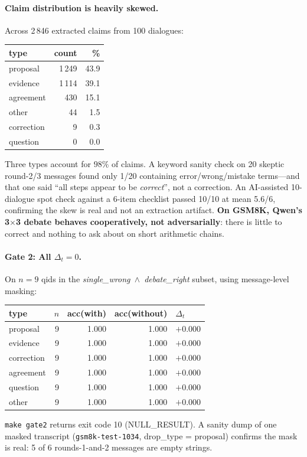 \begin{itemize}
\paragraph{Claim distribution is heavily skewed.}
Across 2\,846 extracted claims from 100 dialogues:
\begin{center}
\begin{tabular}{lrr}
\toprule
type & count & \% \\
\midrule
proposal   & 1\,249 & 43.9 \\
evidence   & 1\,114 & 39.1 \\
agreement  &    430 & 15.1 \\
other      &     44 &  1.5 \\
correction &      9 &  0.3 \\
question   &      0 &  0.0 \\
\bottomrule
\end{tabular}
\end{center}
Three types account for $98\%$ of claims. A keyword sanity check on 20 skeptic round-2/3 messages found only 1/20 containing error/wrong/mistake terms---and that one said ``all steps appear to be \textit{correct}'', not a correction. An AI-assisted 10-dialogue spot check against a 6-item checklist passed 10/10 at mean 5.6/6, confirming the skew is real and not an extraction artifact. \textbf{On GSM8K, Qwen's 3$\times$3 debate behaves cooperatively, not adversarially}: there is little to correct and nothing to ask about on short arithmetic chains.

\paragraph{Gate 2: All $\Delta_t=0$.}
On $n=9$ qids in the \textit{single\_wrong~$\wedge$~debate\_right} subset, using message-level masking:
\begin{center}
\begin{tabular}{lrrrl}
\toprule
type & $n$ & acc(with) & acc(without) & $\Delta_t$ \\
\midrule
proposal   & 9 & 1.000 & 1.000 & $+0.000$ \\
evidence   & 9 & 1.000 & 1.000 & $+0.000$ \\
correction & 9 & 1.000 & 1.000 & $+0.000$ \\
agreement  & 9 & 1.000 & 1.000 & $+0.000$ \\
question   & 9 & 1.000 & 1.000 & $+0.000$ \\
other      & 9 & 1.000 & 1.000 & $+0.000$ \\
\bottomrule
\end{tabular}
\end{center}
\texttt{make gate2} returns exit code 10 (NULL\_RESULT). A sanity dump of one masked transcript (\texttt{gsm8k-test-1034}, drop\_type = proposal) confirms the mask is real: 5 of 6 rounds-1-and-2 messages are empty strings.


\end{itemize}
